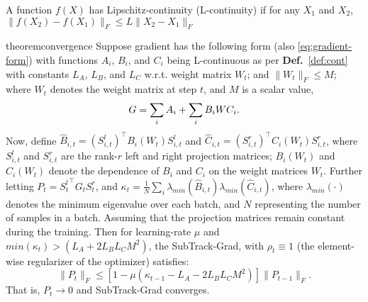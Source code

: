 \begin{definition}[\bf{L-continuity}]\label{def:cont}
 A function \(f(X)\) has Lipschitz-continuity (L-continuity) if for any \(X_1\) and \(X_2\), \( \|f(X_2) - f(X_1)\|_F \leq L\|X_2 - X_1\|_F \)
 \end{definition}

\begin{restatable}{theorem}{convergence}
\label{th:convergence}
Suppose gradient has the following form (also \eqref{eq:gradient-form}) with functions \(A_i\), \(B_i\), and \(C_i\) being L-continuous as per \textbf{Def.}~\ref{def:cont} with constants \(L_A\), \(L_B\), and \(L_C\) w.r.t. weight matrix \(W_t\); and \(\|W_t\|_F \leq M\); where \(W_t\) denotes the weight matrix at step \(t\), and \(M\) is a scalar value,
\begin{equation*}
\small
    G = \sum_i A_i + \sum_i B_iWC_i.
\end{equation*}
Now, define \(\widehat{B}_{i,t} = (S_{i, t}^l)^\top B_i(W_t) S_{i, t}^l\) and 
\(\widehat{C}_{i,t} = (S_{i, t}^r)^\top C_i(W_t) S_{i, t}^r\), where \(S_{i, t}^l\) and \(S_{i, t}^r\) are the rank-\(r\) left and right projection matrices; \(B_i(W_t)\) and \(C_i(W_t)\) denote the dependence of \(B_i\) and \(C_i\) on the weight matrices \(W_t\). Further letting \(P_t = {S_t^l}^\top G_t S_t^r\), and \(\kappa_t = \frac{1}{N} \sum_i \lambda_{min}(\widehat{B}_{i, t}) \lambda_{min}(\widehat{C}_{i, t})\), where $\lambda_{min}(\cdot)$ denotes the minimum eigenvalue over each batch, and \( N \) representing the number of samples in a batch. Assuming that the projection matrices remain constant during the training. Then  for learning-rate \(\mu\) and \(min(\kappa_t) > (L_A + 2L_B L_C M^2)\), the  SubTrack-Grad, with \(\rho_t \equiv 1\) (the element-wise regularizer of the optimizer) satisfies:
\[
    \|P_t\|_F \leq [1-\mu(\kappa_{t-1} - L_A - 2L_B L_C M^2)]\|P_{t-1}\|_F.
\]
That is, \(P_t \rightarrow 0\) and SubTrack-Grad converges.
\end{restatable}